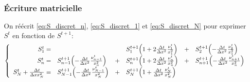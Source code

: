 \subsubsection{Écriture matricielle}
On réécrit \eqref{eq:S_discret_n}, \eqref{eq:S_discret_1} et \eqref{eq:S_discret_N} pour exprimer $S^t$ en fonction de $S^{t+1}$:
\begin{equation}
  \left\lbrace\begin{array}{r l c l c l }
    S^{t}_1 = &
               & &S_1^{t+1}\left(1 + 2\frac{\Delta t}{\Delta x^2}\frac{\nu_1^t}{x_1^2}\right)
               &+& S_{2}^{t+1}\left(-\frac{\Delta t}{\Delta x^2}\frac{\nu_{2}^t}{x_1^2}\right)\\
    S^{t}_n = &S_{n-1}^{t+1}\left(-\frac{\Delta t}{\Delta x^2}\frac{\nu_{n-1}^t}{x_n^2}\right)
               &+& S_n^{t+1}\left(1 + 2\frac{\Delta t}{\Delta x^2}\frac{\nu_n^t}{x_n^2}\right)
               &+& S_{n+1}^{t+1}\left(-\frac{\Delta t}{\Delta x^2}\frac{\nu_{n+1}^t}{x_n^2}\right)\\
    S^{t}_N + \frac{\Delta t}{\Delta x x_N^2} =
               &S^{t+1}_{N-1} \left(-\frac{\Delta t}{\Delta x^2}\frac{\nu_{N-1}^t}{x_N^2}\right)
               &+& S_N^{t+1} \left(1 + \frac{\Delta t}{\Delta x^2}\frac{\nu^t_N}{x_N^2}\right)
               & &
  \end{array}\right.
\end{equation}

